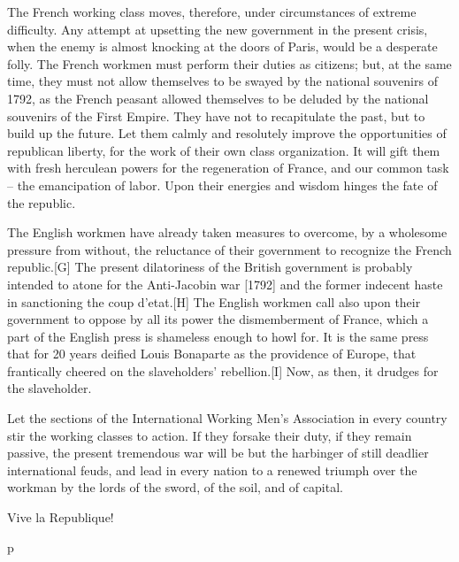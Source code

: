 \documentclass{article}
\begin{document}
The French working class moves, therefore, under circumstances of extreme
difficulty. Any attempt at upsetting the new government in the present
crisis, when the enemy is almost knocking at the doors of Paris, would be
a desperate folly. The French workmen must perform their duties as
citizens; but, at the same time, they must not allow themselves to be
swayed by the national souvenirs of 1792, as the French peasant allowed
themselves to be deluded by the national souvenirs of the First Empire.
They have not to recapitulate the past, but to build up the future. Let
them calmly and resolutely improve the opportunities of republican
liberty, for the work of their own class organization. It will gift them
with fresh herculean powers for the regeneration of France, and our common
task – the emancipation of labor. Upon their energies and wisdom hinges
the fate of the republic.

The English workmen have already taken measures to overcome, by
a wholesome pressure from without, the reluctance of their government to
recognize the French republic.[G] The present dilatoriness of the British
government is probably intended to atone for the Anti-Jacobin war [1792]
and the former indecent haste in sanctioning the coup d’etat.[H] The
English workmen call also upon their government to oppose by all its power
the dismemberment of France, which a part of the English press is
shameless enough to howl for. It is the same press that for 20 years
deified Louis Bonaparte as the providence of Europe, that frantically
cheered on the slaveholders’ rebellion.[I] Now, as then, it drudges for
the slaveholder.

Let the sections of the International Working Men’s Association in every
country stir the working classes to action. If they forsake their duty, if
they remain passive, the present tremendous war will be but the harbinger
of still deadlier international feuds, and lead in every nation to
a renewed triumph over the workman by the lords of the sword, of the soil,
and of capital.

Vive la Republique!

p
\end{document}

